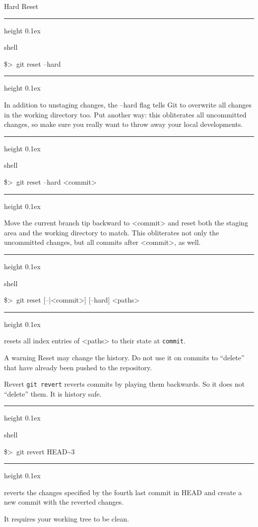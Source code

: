 \documentclass{beamer}
\newenvironment{shell}{%
\footnotesize\flushleft\hrule height 0.1ex
\tt\begin{beamercolorbox}[sep=1ex,left]{shell}%
}{%
\end{beamercolorbox}
\hrule height 0.1ex
\endflushleft\par
}
\newcommand*{\psone}[1][ant]{\$>~}
\begin{document}

\begin{frame}{Hard Reset}
\begin{shell}
\psone git reset --hard
\end{shell}
{\small 
In addition to unstaging changes, the --hard flag tells Git to \alert{overwrite all changes in the working directory} too. Put another way: \alert{this obliterates all uncommitted changes}, so make sure you really want to throw away your local developments.
}
\begin{shell}
\psone git reset --hard <commit>
\end{shell}
{\small Move the current branch tip backward to <commit> and reset both the staging area and the working directory to match. This obliterates not only the uncommitted changes, but all commits after <commit>, as well.
}
\begin{shell}
\psone git reset [--|<commit>] [--hard] <paths>
\end{shell}
{
\small
resets all index entries of <paths> to their state at \texttt{commit}.
}
\end{frame}

\begin{frame}{A warning}
Reset may change the history. \alert{Do not use it on commits to ``delete'' that have already been pushed to the repository}.
\end{frame}
\begin{frame}{Revert}
\texttt{git revert} reverts commits by \alert{playing them backwards}. So it does not ``delete'' them. It is history safe.
\begin{shell}
\psone git revert HEAD\textasciitilde{}3
\end{shell}

reverts the changes specified by the fourth last commit in HEAD and
          create a new commit with the reverted changes.
\smallskip

\alert{It requires your working tree to be clean.}
\end{frame}
\end{document}

